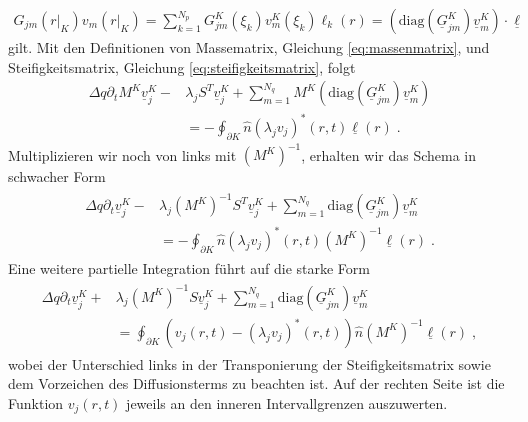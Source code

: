 \begin{align}
  G_{jm}(r|_K)v_m(r|_K)  = \sum_{k=1}^{N_p} G_{jm}^K(\xi_k)v_m^K(\xi_k) \ell_k(r) = \left(\text{diag}(\underline{G}_{jm}^K) \underline{v}_m^K\right) \cdot \underline{ \ell }
\end{align}
gilt. Mit den Definitionen von Massematrix, Gleichung \eqref{eq:massenmatrix}, und Steifigkeitsmatrix, Gleichung \eqref{eq:steifigkeitsmatrix}, folgt
\begin{align*}
  \Delta q \partial_t M^K \underline{v}_j^K - &\lambda_j S^T\underline{v}_j^K + \sum_{m=1}^{N_q} M^K \left(\text{diag}(\underline{G}_{jm}^K) \underline{v}_m^K\right) \\
  &= - \oint_{\partial K}  \hat{n} (\lambda_j v_j)^*(r,t)\underline{\ell}(r) \; .
\end{align*}
Multiplizieren wir noch von links mit $(M^K)^{-1}$, erhalten wir das Schema in schwacher Form
\begin{gather}
\begin{align}
  \Delta q \partial_t \underline{v}_j^K - &\lambda_j (M^K)^{-1}S^T\underline{v}_j^K + \sum_{m=1}^{N_q} \text{diag}(\underline{G}_{jm}^K) \underline{v}_m^K \\
  &= - \oint_{\partial K}  \hat{n} (\lambda_j v_j)^*(r,t) (M^K)^{-1}\underline{\ell}(r) \; .
\end{align}
\end{gather}
Eine weitere partielle Integration führt auf die starke Form
\begin{gather}
\begin{align}
  \Delta q \partial_t \underline{v}_j^K + &\lambda_j (M^K)^{-1}S\underline{v}_j^K + \sum_{m=1}^{N_q} \text{diag}(\underline{G}_{jm}^K) \underline{v}_m^K \\
  &=  \oint_{\partial K}  (v_j(r,t) - (\lambda_j v_j)^*(r,t)) \hat{n}  (M^K)^{-1}\underline{\ell}(r) \; ,
\end{align}
\end{gather}
wobei der Unterschied links in der Transponierung der Steifigkeitsmatrix sowie dem Vorzeichen des Diffusionsterms zu beachten ist. Auf der rechten Seite ist die Funktion $v_j(r,t)$ jeweils an den inneren Intervallgrenzen auszuwerten.

